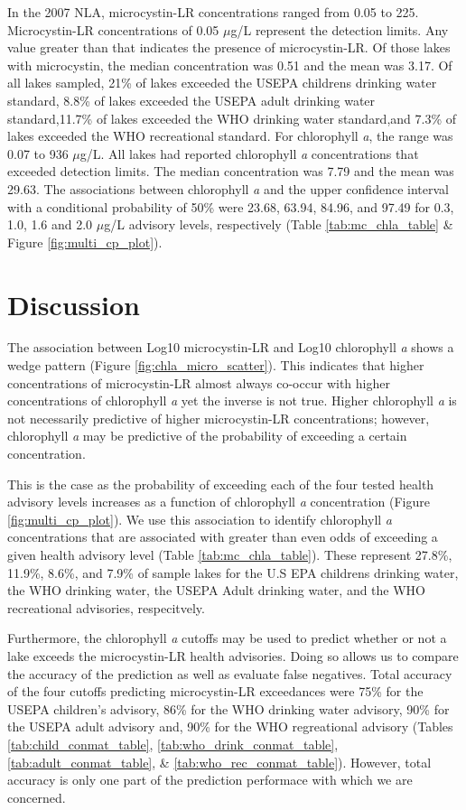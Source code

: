 \documentclass[11pt,]{article}
\begin{document}
In the 2007 NLA, microcystin-LR concentrations ranged from 0.05 to 225.
Microcystin-LR concentrations of 0.05 \(\mu\)g/L represent the detection
limits. Any value greater than that indicates the presence of
microcystin-LR. Of those lakes with microcystin, the median
concentration was 0.51 and the mean was 3.17. Of all lakes sampled, 21\%
of lakes exceeded the USEPA childrens drinking water standard, 8.8\% of
lakes exceeded the USEPA adult drinking water standard,11.7\% of lakes
exceeded the WHO drinking water standard,and 7.3\% of lakes exceeded the
WHO recreational standard. For chlorophyll \emph{a}, the range was 0.07
to 936 \(\mu\)g/L. All lakes had reported chlorophyll \emph{a}
concentrations that exceeded detection limits. The median concentration
was 7.79 and the mean was 29.63. The associations between chlorophyll
\emph{a} and the upper confidence interval with a conditional
probability of 50\% were 23.68, 63.94, 84.96, and 97.49 for 0.3, 1.0,
1.6 and 2.0 \(\mu\)g/L advisory levels, respectively (Table
\ref{tab:mc_chla_table} \& Figure \ref{fig:multi_cp_plot}).

\section{Discussion}\label{discussion}

The association between Log10 microcystin-LR and Log10 chlorophyll
\emph{a} shows a wedge pattern (Figure \ref{fig:chla_micro_scatter}).
This indicates that higher concentrations of microcystin-LR almost
always co-occur with higher concentrations of chlorophyll \emph{a} yet
the inverse is not true. Higher chlorophyll \emph{a} is not necessarily
predictive of higher microcystin-LR concentrations; however, chlorophyll
\emph{a} may be predictive of the probability of exceeding a certain
concentration.

This is the case as the probability of exceeding each of the four tested
health advisory levels increases as a function of chlorophyll \emph{a}
concentration (Figure \ref{fig:multi_cp_plot}). We use this association
to identify chlorophyll \emph{a} concentrations that are associated with
greater than even odds of exceeding a given health advisory level (Table
\ref{tab:mc_chla_table}). These represent 27.8\%, 11.9\%, 8.6\%, and
7.9\% of sample lakes for the U.S EPA childrens drinking water, the WHO
drinking water, the USEPA Adult drinking water, and the WHO recreational
advisories, respecitvely.

Furthermore, the chlorophyll \emph{a} cutoffs may be used to predict
whether or not a lake exceeds the microcystin-LR health advisories.
Doing so allows us to compare the accuracy of the prediction as well as
evaluate false negatives. Total accuracy of the four cutoffs predicting
microcystin-LR exceedances were 75\% for the USEPA children's advisory,
86\% for the WHO drinking water advisory, 90\% for the USEPA adult
advisory and, 90\% for the WHO regreational advisory (Tables
\ref{tab:child_conmat_table}, \ref{tab:who_drink_conmat_table},
\ref{tab:adult_conmat_table}, \& \ref{tab:who_rec_conmat_table}).
However, total accuracy is only one part of the prediction performace
with which we are concerned.
\end{document}
